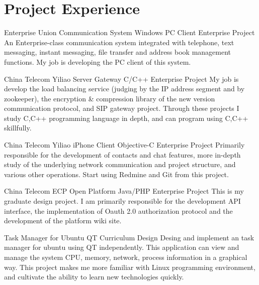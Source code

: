 \documentclass[11pt,a4paper]{moderncv}
\begin{document}
\section{Project Experience}
{Enterprise Union Communication System}
{Windows PC Client}
{Enterprise Project}{}
{
An Enterprise-class communication system integrated with telephone, text messaging, instant messaging,
file transfer and address book management functions. My job is developing the PC client of this system.
}

\vspace*{0.2\baselineskip}
{China Telecom Yiliao Server Gateway}
{C/C++}
{Enterprise Project}{}
{
My job is develop the load balancing service (judging by the IP address segment and by zookeeper), 
the encryption  & compression library of the new version communication protocol, and SIP gateway project.
Through these projects I study  C,C++ programming language in depth, and can program using C,C++ skillfully.
}

\vspace*{0.2\baselineskip}
{China Telecom Yiliao iPhone Client}
{Objective-C}
{Enterprise Project}{}
{
Primarily responsible for the development of contacts and chat features, more in-depth study of the underlying network communication and project structure,
and various other operations. Start using Redmine and Git from this project.
}

\vspace*{0.2\baselineskip}
{China Telecom ECP Open Platform}
{Java/PHP}
{Enterprise Project}{}
{
This is my graduate design project. I am primarily responsible for the development API interface, the implementation of Oauth 2.0 authorization protocol
and the development of the platform wiki site.
}

\vspace*{0.2\baselineskip}
{Task Manager for Ubuntu}
{QT}
{Curriculum Design}{}
{
Desing and implement an task manager for ubuntu using QT independently. This application can view and manage
the system CPU, memory, network, process information  in a graphical way. This project makes me more familiar
with Linux programming environment, and cultivate the ability to learn new technologies quickly.
}
\end{document}
